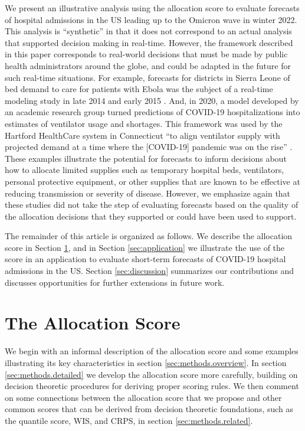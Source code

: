 \documentclass{article}\usepackage[]{graphicx}\usepackage[]{xcolor}
\begin{document}
We present an illustrative analysis using the allocation score to evaluate forecasts of hospital admissions in the US leading up to the Omicron wave in winter 2022.
This analysis is ``synthetic'' in that it does not correspond to an actual analysis that supported decision making in real-time.
However, the framework described in this paper corresponds to real-world decisions that must be made by public health administrators around the globe, and could be adapted in the future for such real-time situations.
For example, forecasts for districts in Sierra Leone of bed demand to care for patients with Ebola was the subject of a real-time modeling study in late 2014 and early 2015 \citep{camacho2015-ebola-bed}.
And, in 2020, a model developed by an academic research group turned predictions of COVID-19 hospitalizations into estimates of ventilator usage and shortages. This framework was used by the Hartford HealthCare system in Connecticut ``to align ventilator supply with projected demand at a time where the [COVID-19] pandemic was on the rise'' \citep{bertsimas2021predictionsCOVID}.
These examples illustrate the potential for forecasts to inform decisions about how to allocate limited supplies such as temporary hospital beds, ventilators, personal protective equipment, or other supplies that are known to be effective at reducing transmission or severity of disease.
However, we emphasize again that these studies did not take the step of evaluating forecasts based on the quality of the allocation decisions that they supported or could have been used to support.

The remainder of this article is organized as follows.
We describe the allocation score in Section \ref{sec:methods}, and in Section \ref{sec:application} we illustrate the use of the score in an application to evaluate short-term forecasts of COVID-19 hospital admissions in the US.
Section \ref{sec:discussion} summarizes our contributions and discusses opportunities for further extensions in future work.


\section{The Allocation Score}
\label{sec:methods}

We begin with an informal description of the allocation score and some examples illustrating its key characteristics in section \ref{sec:methods.overview}. In section \ref{sec:methods.detailed} we develop the allocation score more carefully, building on decision theoretic procedures for deriving proper scoring rules. We then comment on some connections between the allocation score that we propose and other common scores that can be derived from decision theoretic foundations, such as the quantile score, WIS, and CRPS, in section \ref{sec:methods.related}.
\end{document}
